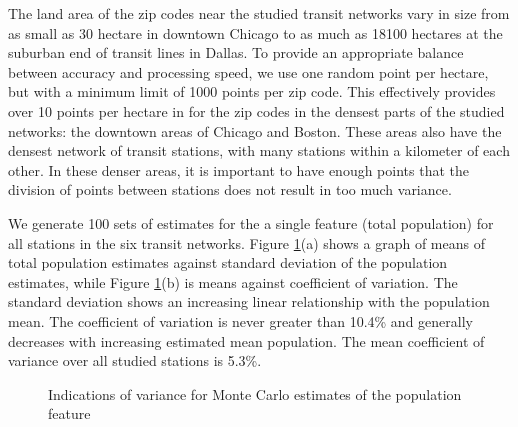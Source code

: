 \documentclass[11pt]{article}
\begin{document}
The land area of the zip codes near the studied transit networks vary in size from as small as 30 hectare in downtown Chicago to as much as 18100 hectares at the suburban end of transit lines in Dallas. To provide an appropriate balance between accuracy and processing speed, we use one random point per hectare, but with a minimum limit of 1000 points per zip code. This effectively provides over 10 points per hectare in for the zip codes in the densest parts of the studied networks: the downtown areas of Chicago and Boston. These areas also have the densest network of transit stations, with many stations within a kilometer of each other. In these denser areas, it is important to have enough points that the division of points between stations does not result in too much variance. 

We generate 100 sets of estimates for the a single feature (total population) for all stations in the six transit networks. Figure \ref{fig:mcvar}(a) shows a graph of means of total population estimates against standard deviation of the population estimates, while Figure \ref{fig:mcvar}(b) is means against coefficient of variation. The standard deviation shows an increasing linear relationship with the population mean. The coefficient of variation is never greater than 10.4\% and generally decreases with increasing estimated mean population. The mean coefficient of variance over all studied stations is 5.3\%. 

\begin{figure}[H]
\centering
{}
\caption{Indications of variance for Monte Carlo estimates of the population feature}\label{fig:mcvar}
\end{figure}
\end{document}
